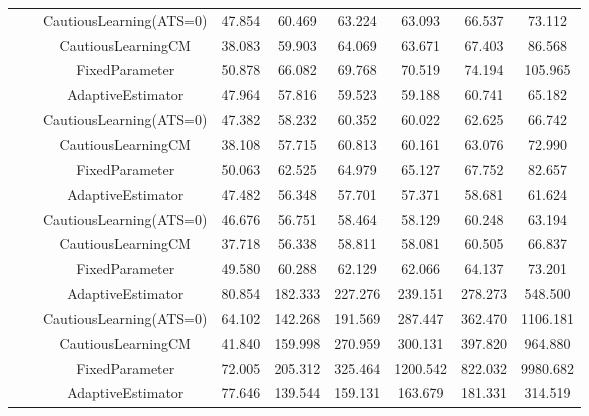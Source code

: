 \begin{table}[!h]
\begin{tabular}[t]{ccccccccc}
 &  & CautiousLearning(ATS=0) & 47.854 & 60.469 & 63.224 & 63.093 & 66.537 & 73.112\\

 &  & CautiousLearningCM & 38.083 & 59.903 & 64.069 & 63.671 & 67.403 & 86.568\\

 & \multirow[t]{-4}{*}{\centering\arraybackslash 1.00} & FixedParameter & 50.878 & 66.082 & 69.768 & 70.519 & 74.194 & 105.965\\
\cmidrule{2-9}
 &  & AdaptiveEstimator & 47.964 & 57.816 & 59.523 & 59.188 & 60.741 & 65.182\\

 &  & CautiousLearning(ATS=0) & 47.382 & 58.232 & 60.352 & 60.022 & 62.625 & 66.742\\

 &  & CautiousLearningCM & 38.108 & 57.715 & 60.813 & 60.161 & 63.076 & 72.990\\

 & \multirow[t]{-4}{*}{\centering\arraybackslash 1.25} & FixedParameter & 50.063 & 62.525 & 64.979 & 65.127 & 67.752 & 82.657\\
\cmidrule{2-9}
 &  & AdaptiveEstimator & 47.482 & 56.348 & 57.701 & 57.371 & 58.681 & 61.624\\

 &  & CautiousLearning(ATS=0) & 46.676 & 56.751 & 58.464 & 58.129 & 60.248 & 63.194\\

 &  & CautiousLearningCM & 37.718 & 56.338 & 58.811 & 58.081 & 60.505 & 66.837\\

\multirow[t]{-28}{*}{\centering\arraybackslash 50} & \multirow[t]{-4}{*}{\centering\arraybackslash 1.50} & FixedParameter & 49.580 & 60.288 & 62.129 & 62.066 & 64.137 & 73.201\\
\cmidrule{1-9}
 &  & AdaptiveEstimator & 80.854 & 182.333 & 227.276 & 239.151 & 278.273 & 548.500\\

 &  & CautiousLearning(ATS=0) & 64.102 & 142.268 & 191.569 & 287.447 & 362.470 & 1106.181\\

 &  & CautiousLearningCM & 41.840 & 159.998 & 270.959 & 300.131 & 397.820 & 964.880\\

 & \multirow[t]{-4}{*}{\centering\arraybackslash 0.25} & FixedParameter & 72.005 & 205.312 & 325.464 & 1200.542 & 822.032 & 9980.682\\
\cmidrule{2-9}
 &  & AdaptiveEstimator & 77.646 & 139.544 & 159.131 & 163.679 & 181.331 & 314.519\\


\end{tabular}
\end{table}
